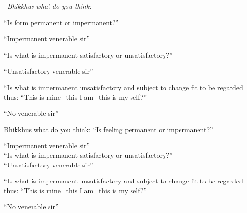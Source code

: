 \begin{english-only-leader}
  \anglebracketleft\ \hspace{-0.5mm}\textit{Bhikkhus what do you think:} \hspace{-0.5mm}\anglebracketright\
\end{english-only-leader}
\ifninebythirteenversion\clearpage\fi
\begin{english-only-hang-together}
  ``Is form permanent or impermanent?''
\end{english-only-hang-together}
\begin{english-only-hang-together}
  ``Impermanent venerable sir''
\end{english-only-hang-together}
\begin{english-only-hang-together}
  ``Is what is impermanent satisfactory or unsatisfactory?''
\end{english-only-hang-together}
\begin{english-only-hang-together}
  ``Unsatisfactory venerable sir''
\end{english-only-hang-together}
\begin{english-only-hang-together}
  ``Is what is impermanent unsatisfactory and subject to change fit to be regarded thus: ``This is mine \breathmark\ this I am \breathmark\ this is my self?''
\end{english-only-hang-together}
\begin{english-only-hang-together}
  ``No venerable sir''
\end{english-only-hang-together}

\begin{english-only-no-hang}
  \begin{english-only-hang}
    Bhikkhus what do you think: ``Is feeling permanent or impermanent?''
  \end{english-only-hang}
  ``Impermanent venerable sir''\\
  ``Is what is impermanent satisfactory or unsatisfactory?''\\
  ``Unsatisfactory venerable sir''\\
  \begin{english-hang-together}
    ``Is what is impermanent unsatisfactory and subject to change fit to be regarded thus: ``This is mine \breathmark\ this I am \breathmark\ this is my self?''
  \end{english-hang-together}
  ``No venerable sir''
\end{english-only-no-hang}

